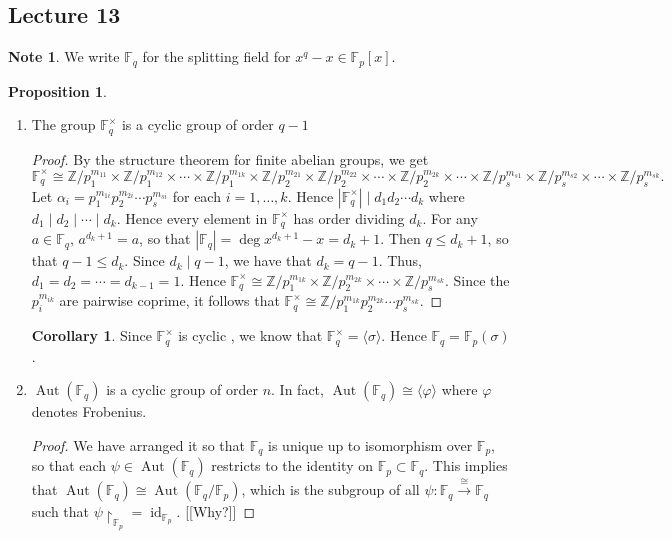 \documentclass[10pt,letterpaper,cm]{nupset}
\theoremstyle{definition}
\newtheorem{note}{Note}
\newtheorem{prop}{Proposition}
\newtheorem{corollary}{Corollary}
\newcommand{\F}{\mathbb F}
\newcommand{\Z}{\mathbb Z}
\newcommand{\1}{\mathbf{1}}
\newcommand{\0}{\vec 0}
\DeclareMathOperator{\id}{id}
\DeclareMathOperator{\aut}{Aut}
\begin{document}
\subsection{Lecture 13}

\begin{note}
We write $\F_q$ for the splitting field for $x^q -x \in \F_p[x]$.
\end{note}

\begin{prop} $ $
\begin{enumerate}
\item The group $\F_q^{\times}$ is a cyclic group of order $q-1$
\begin{proof}
By the structure theorem for finite abelian groups, we get 
$$\F_q^{\times} \cong  \Z/p_1^{m_{11}} \times \Z/p_1^{m_{12}} \times \cdots \times \Z/p_1^{m_{1k}} \times \Z/p_2^{m_{21}} \times \Z/p_2^{m_{22}} \times \cdots \times \Z/p_2^{m_{2k}} \times \cdots \times \Z/p_s^{m_{s1}} \times \Z/p_s^{m_{s2}} \times \cdots \times \Z/p_s^{m_{sk}} .$$ 
Let $\alpha_i = p_1^{m_{1i}}p_2^{m_{2i}}\cdots p_s^{m_{si}}$ for each $i=1, \ldots, k$. Hence $|\F_q^{\times}| \mid d_1d_2 \cdots d_k$ where $d_1 \mid d_2 \mid \cdots \mid d_k$. Hence every element in $\F_q^{\times}$ has order dividing $d_k$.  For any $a\in \F_q$, $a^{d_k +1} =a$, so that $|\F_q| = \deg{x^{d_k+1} -x} = d_k+1$. Then $q \leq d_k+1$, so that $q-1 \leq d_k$. Since $d_k \mid q-1$, we have that $d_k = q-1$. Thus, $d_1 = d_2 = \cdots = d_{k-1} = 1$. Hence $\F_q^{\times} \cong \Z/p_1^{m_{1k}} \times \Z/p_2^{m_{2k}} \times \cdots \times \Z/p_s^{m_{sk}}$. Since the $p_i^{m_{ik}}$ are pairwise coprime, it follows that $\F_q^{\times} \cong  \Z/p_1^{m_{1k}} p_2^{m_{2k}} \cdots p_s^{m_{sk}}$. 
\end{proof}
\begin{corollary}
Since $\F_q^{\times}$ is cyclic , we know that $\F_q^{\times} = \langle \sigma \rangle$. Hence $\F_q = \F_p(\sigma)$.
\end{corollary}
\item $\aut(\F_q)$ is a cyclic group of order $n$. In fact, $\aut(\F_q) \cong \langle \varphi \rangle$ where $\varphi$ denotes Frobenius.
\begin{proof}
We have arranged it so that $\F_q$ is unique up to isomorphism over $\F_p$, so that each $\psi \in \aut(\F_q)$ restricts to the identity on $\F_p \subset \F_q$. This implies that $\aut(\F_q) \cong \aut(\F_q/\F_p)$, which is the subgroup of all $\psi : \F_q \overset{\cong}{\longrightarrow} \F_q$ such that $\psi \restriction_{\F_p} = \id_{\F_p}$. {[[Why?]]}

\end{proof}
\end{enumerate}
\end{prop}
\end{document}
